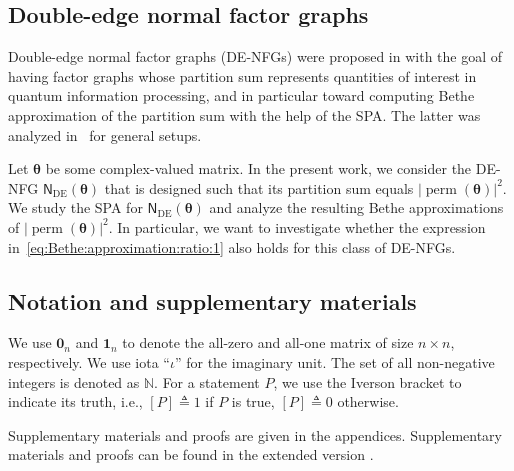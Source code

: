 \documentclass[conference]{IEEEtran}
\theoremstyle{plain}
\theoremstyle{definition}
\providecommand{\N}{\mathbb {N}}
\newcommand{\sfn}{\mathsf{N}}
\newcommand{\perm}{\operatorname{perm}}
\newcommand{\btheta}{\boldsymbol{\theta}}
\newcommand{\defeq}{\triangleq}
\newcommand{\sfnDE}{\sfn_{\mathrm{DE}}}
\begin{document}
\subsection{Double-edge normal factor graphs}


Double-edge normal factor graphs (DE-NFGs) were proposed in
\cite{caoDoubleedgeFactorGraphs2017} with the goal of having factor graphs
whose partition sum represents quantities of interest in quantum information
processing, and in particular toward computing Bethe approximation of the
partition sum with the help of the SPA. The latter was analyzed
in~\cite{huangCharacterizingBethePartition2020,
huangGraphcoverbasedCharacterizationBethe2025} for general setups.


Let $\btheta$ be some complex-valued matrix. In the present work, we consider
the DE-NFG $\sfnDE(\btheta)$ that is designed such that its partition sum
equals $|\perm(\btheta)|^2$. We study the SPA for $\sfnDE(\btheta)$ and analyze
the resulting Bethe approximations of $|\perm(\btheta)|^2$. In particular, we
want to investigate whether the expression
in~\eqref{eq:Bethe:approximation:ratio:1} also holds for this class of DE-NFGs.


\subsection{Notation and supplementary materials}


We use $\mathbf 0_n $ and $\mathbf 1_n$ to denote the all-zero and all-one
matrix of size $n\times n$, respectively. We use iota ``$\iota$'' for the
imaginary unit. The set of all non-negative integers is denoted as $\N$. For a
statement $P$, we use the Iverson bracket to indicate its truth, i.e.,
$[P]\defeq 1$ if $P$ is true, $[P]\defeq 0$ otherwise.

\iflongversion Supplementary materials and proofs are given in the appendices.
\else Supplementary materials and proofs can be found in the extended version
 \cite{zhou2026}.  \fi
\end{document}
